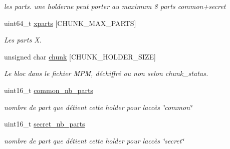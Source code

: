 \begin{DoxyCompactItemize}
\begin{DoxyCompactList}\small\item\em les parts. une holderne peut porter au maximum 8 parts common+secret \end{DoxyCompactList}\item 
\mbox{\label{classt__holder_a05f607c47e6a85a28d5bb3054cb8da39}} 
uint64\+\_\+t \hyperlink{classt__holder_a05f607c47e6a85a28d5bb3054cb8da39}{xparts} \mbox{[}C\+H\+U\+N\+K\+\_\+\+M\+A\+X\+\_\+\+P\+A\+R\+TS\mbox{]}
\begin{DoxyCompactList}\small\item\em Les parts X. \end{DoxyCompactList}\item 
\mbox{\label{classt__holder_a90ca7d49e0d605f1652d20eec3ae56e3}} 
unsigned char \hyperlink{classt__holder_a90ca7d49e0d605f1652d20eec3ae56e3}{chunk} \mbox{[}C\+H\+U\+N\+K\+\_\+\+H\+O\+L\+D\+E\+R\+\_\+\+S\+I\+ZE\mbox{]}
\begin{DoxyCompactList}\small\item\em Le bloc dans le fichier M\+PM, déchiffré ou non selon chunk\+\_\+status. \end{DoxyCompactList}\item 
\mbox{\label{classt__holder_a51e696376d22ff824f6aef96f0513ecd}} 
uint16\+\_\+t \hyperlink{classt__holder_a51e696376d22ff824f6aef96f0513ecd}{common\+\_\+nb\+\_\+parts}
\begin{DoxyCompactList}\small\item\em nombre de part que détient cette holder pour l\textquotesingle{}accès \char`\"{}common\char`\"{} \end{DoxyCompactList}\item 
\mbox{\label{classt__holder_a0d5a539a2039ba0ecc36abac0f5795ad}} 
uint16\+\_\+t \hyperlink{classt__holder_a0d5a539a2039ba0ecc36abac0f5795ad}{secret\+\_\+nb\+\_\+parts}
\begin{DoxyCompactList}\small\item\em nombre de part que détient cette holder pour l\textquotesingle{}accès \char`\"{}secret\char`\"{} \end{DoxyCompactList}\item 
\mbox{\label{classt__holder_a3f27e169518bb716f029fa762f410167}} 

\end{DoxyCompactItemize}
